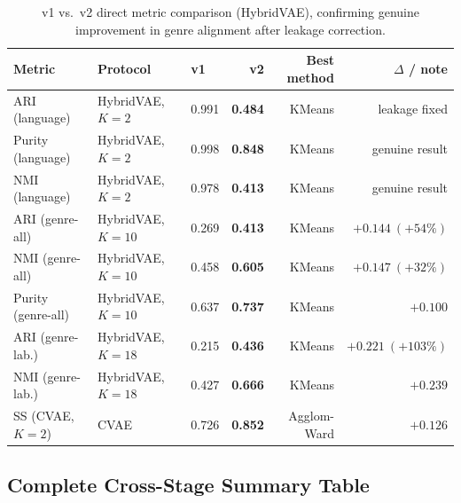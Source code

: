 \documentclass{article}
\begin{document}
\begin{table}[H]
\centering
\caption{v1 vs.\ v2 direct metric comparison (HybridVAE), confirming genuine improvement
in genre alignment after leakage correction.}
\label{tab:v1v2direct}
\small
\begin{tabular}{lllrrr}
\toprule
\textbf{Metric} & \textbf{Protocol} & \textbf{v1} & \textbf{v2} &
\textbf{Best method} & \textbf{$\Delta$ / note} \\
\midrule
ARI (language)    & HybridVAE, $K\!=\!2$  & 0.991 & \textbf{0.484} & KMeans & leakage fixed \\
Purity (language) & HybridVAE, $K\!=\!2$  & 0.998 & \textbf{0.848} & KMeans & genuine result \\
NMI (language)    & HybridVAE, $K\!=\!2$  & 0.978 & \textbf{0.413} & KMeans & genuine result \\
ARI (genre-all)   & HybridVAE, $K\!=\!10$ & 0.269 & \textbf{0.413} & KMeans & \boldmath$+0.144~(+54\%)$ \\
NMI (genre-all)   & HybridVAE, $K\!=\!10$ & 0.458 & \textbf{0.605} & KMeans & \boldmath$+0.147~(+32\%)$ \\
Purity (genre-all)& HybridVAE, $K\!=\!10$ & 0.637 & \textbf{0.737} & KMeans & $+0.100$ \\
ARI (genre-lab.)  & HybridVAE, $K\!=\!18$ & 0.215 & \textbf{0.436} & KMeans & \boldmath$+0.221~(+103\%)$ \\
NMI (genre-lab.)  & HybridVAE, $K\!=\!18$ & 0.427 & \textbf{0.666} & KMeans & $+0.239$ \\
SS (CVAE, $K\!=\!2$) & CVAE             & 0.726 & \textbf{0.852} & Agglom-Ward & $+0.126$ \\
\bottomrule
\end{tabular}
\end{table}

\subsection{Complete Cross-Stage Summary Table}
\end{document}

